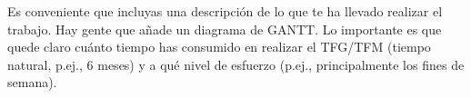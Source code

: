 \documentclass[a4paper, 12pt]{book}
\begin{document}

Es conveniente que incluyas una descripción de lo que te ha llevado realizar el trabajo.
Hay gente que añade un diagrama de GANTT.
Lo importante es que quede claro cuánto tiempo has consumido en realizar el TFG/TFM 
(tiempo natural, p.ej., 6 meses) y a qué nivel de esfuerzo (p.ej., principalmente los 
fines de semana).
\end{document}
